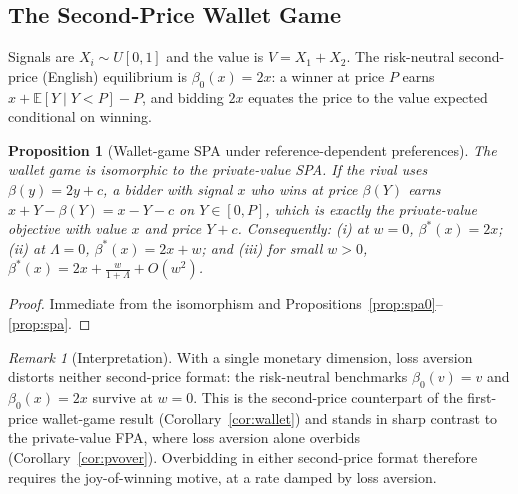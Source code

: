 \documentclass[11pt,a4paper]{article}
\newtheorem{proposition}{Proposition}
\theoremstyle{remark}
\newtheorem{remark}{Remark}
\begin{document}
\subsection{The Second-Price Wallet Game}
\label{sec:walletspsa}
Signals are $X_i\sim U[0,1]$ and the value is $V=X_1+X_2$. The risk-neutral
second-price (English) equilibrium is $\beta_0(x)=2x$: a winner at price $P$ earns
$x+\mathbb{E}[Y\mid Y<P]-P$, and bidding $2x$ equates the price to the value expected
conditional on winning.
\begin{proposition}[Wallet-game SPA under reference-dependent preferences]
\label{prop:walletspsa}
The wallet game is isomorphic to the private-value SPA. If the rival uses
$\beta(y)=2y+c$, a bidder with signal $x$ who wins at price $\beta(Y)$ earns
$x+Y-\beta(Y)=x-Y-c$ on $Y\in[0,P]$, which is exactly the private-value objective with
value $x$ and price $Y+c$. Consequently: (i) at $w=0$, $\beta^{*}(x)=2x$; (ii) at
$\Lambda=0$, $\beta^{*}(x)=2x+w$; and (iii) for small $w>0$,
$\beta^{*}(x)=2x+\frac{w}{1+\Lambda}+O(w^{2})$.
\end{proposition}
\begin{proof}
Immediate from the isomorphism and Propositions~\ref{prop:spa0}--\ref{prop:spa}.
\end{proof}
\begin{remark}[Interpretation]
With a single monetary dimension, loss aversion distorts neither second-price format:
the risk-neutral benchmarks $\beta_0(v)=v$ and $\beta_0(x)=2x$ survive at $w=0$. This is
the second-price counterpart of the first-price wallet-game result
(Corollary~\ref{cor:wallet}) and stands in sharp contrast to the private-value FPA,
where loss aversion alone overbids (Corollary~\ref{cor:pvover}). Overbidding in either
second-price format therefore requires the joy-of-winning motive, at a rate damped by
loss aversion.
\end{remark}
\end{document}
